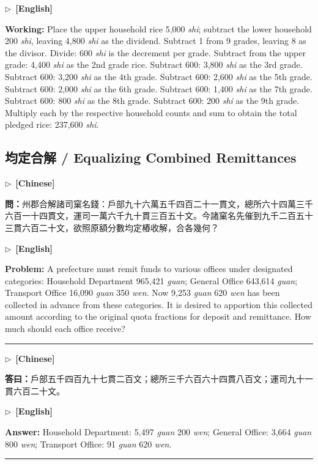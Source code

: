 \documentclass[10pt,a4paper]{article}
\newcommand{\longline}{\par\noindent\rule{\textwidth}{0.4pt}\par}
\newcommand{\CNmarker}{\noindent\textcolor{cnlabel}{$\triangleright$\ \textbf{[Chinese]}}\par}
\newcommand{\ENmarker}{\noindent\textcolor{enlabel}{$\triangleright$\ \textbf{[English]}}\par}
\newcommand{\Question}[1]{\par\noindent\textbf{\color{problemcolor}問：}#1\par}
\newcommand{\Answer}[1]{\par\noindent\textbf{\color{answercolor}答曰：}#1\par}
\newcommand{\QuestionEn}[1]{\par\noindent\textbf{\color{problemcolor}Problem:} #1\par}
\newcommand{\AnswerEn}[1]{\par\noindent\textbf{\color{answercolor}Answer:} #1\par}
\newcommand{\WorkingEn}[1]{\par\noindent\textbf{\color{workingcolor}Working:} #1\par}
\begin{document}
\ENmarker
\WorkingEn{Place the upper household rice 5,000 \textit{shi}; subtract the lower household 200 \textit{shi}, leaving 4,800 \textit{shi} as the dividend. Subtract 1 from 9 grades, leaving 8 as the divisor. Divide: 600 \textit{shi} is the decrement per grade. Subtract from the upper grade: 4,400 \textit{shi} as the 2nd grade rice. Subtract 600: 3,800 \textit{shi} as the 3rd grade. Subtract 600: 3,200 \textit{shi} as the 4th grade. Subtract 600: 2,600 \textit{shi} as the 5th grade. Subtract 600: 2,000 \textit{shi} as the 6th grade. Subtract 600: 1,400 \textit{shi} as the 7th grade. Subtract 600: 800 \textit{shi} as the 8th grade. Subtract 600: 200 \textit{shi} as the 9th grade. Multiply each by the respective household counts and sum to obtain the total pledged rice: 237,600 \textit{shi}.}


\newpage
\subsection*{均定合解 / Equalizing Combined Remittances}

\CNmarker
\Question{州郡合解諸司窠名錢：戶部九十六萬五千四百二十一貫文，總所六十四萬三千六百一十四貫文，運司一萬六千九十貫三百五十文。今諸窠名先催到九千二百五十三貫六百二十文，欲照原額分數均定樁收解，合各幾何？}

\ENmarker
\QuestionEn{A prefecture must remit funds to various offices under designated categories: Household Department 965,421 \textit{guan}; General Office 643,614 \textit{guan}; Transport Office 16,090 \textit{guan} 350 \textit{wen}. Now 9,253 \textit{guan} 620 \textit{wen} has been collected in advance from these categories. It is desired to apportion this collected amount according to the original quota fractions for deposit and remittance. How much should each office receive?}

\longline

\CNmarker
\Answer{戶部五千四百九十七貫二百文；總所三千六百六十四貫八百文；運司九十一貫六百二十文。}

\ENmarker
\AnswerEn{Household Department: 5,497 \textit{guan} 200 \textit{wen}; General Office: 3,664 \textit{guan} 800 \textit{wen}; Transport Office: 91 \textit{guan} 620 \textit{wen}.}

\longline
\end{document}
